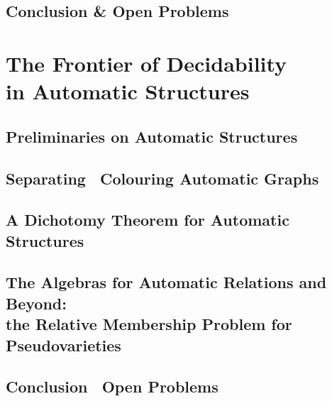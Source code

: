 \documentclass[a4paper,sfsidenotes,twoside,justified]{tufte-book-custom}
\begin{document}
\chapter{Conclusion \& Open Problems}

\part[The Frontier of Decidability in Automatic Structures]{The Frontier of Decidability\\in Automatic Structures}

\chapter{Preliminaries on Automatic Structures}

\chapter{Separating \fancyand~Colouring Automatic Graphs}

\chapter{A Dichotomy Theorem for Automatic Structures}

\chapter{The Algebras for Automatic Relations and Beyond:\\the Relative Membership Problem for Pseudovarieties}

\chapter{Conclusion \fancyand~Open Problems}


\backmatter



\end{document}
